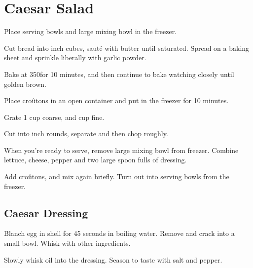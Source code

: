 \section{Caesar Salad}
\begin{recipe}

Place serving bowls and large mixing bowl in the freezer.


Cut bread into  inch cubes, sauté  with butter until saturated. Spread on a baking sheet and sprinkle liberally with garlic powder.

Bake at 350\degree for 10 minutes, and then continue to bake watching closely until golden brown.

Place croûtons in an open container and put in the freezer for 10 minutes.


Grate 1 cup coarse, and  cup fine.

\columnbreak


Cut into  inch rounds, separate and then chop roughly.


When you're ready to serve, remove large mixing bowl from freezer. Combine lettuce, cheese, pepper and two large spoon fulls of dressing.

Add croûtons, and mix again briefly. Turn out into serving bowls from the freezer.


\subsection{Caesar Dressing}


Blanch egg in shell for 45 seconds in boiling water. Remove and crack into a small bowl. Whisk with other ingredients.


Slowly whisk oil into the dressing. Season to taste with salt and pepper.

\end{recipe}
